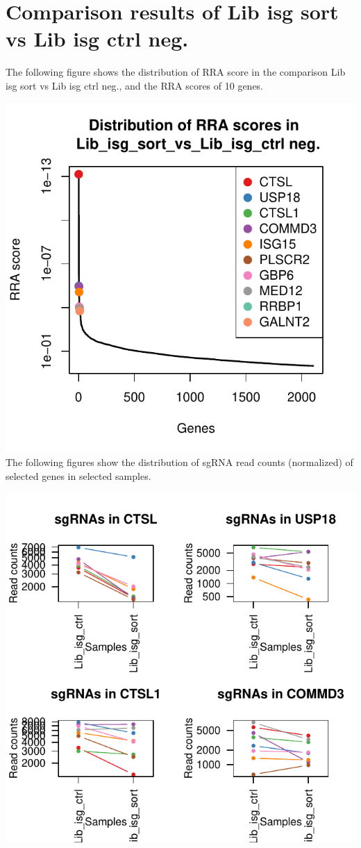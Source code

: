 \documentclass{article}
\begin{document}
\newpage\section{Comparison results of Lib isg sort vs Lib isg ctrl neg.}

The following figure shows the distribution of RRA score in the comparison Lib isg sort vs Lib isg ctrl neg., and the RRA scores of 10 genes.

%


\includegraphics{MageckLibISG_CoVclust_summary-004}
\clearpage
\newpage
The following figures show the distribution of sgRNA read counts (normalized) of selected genes in selected samples.
%


\includegraphics{MageckLibISG_CoVclust_summary-005}
%
\end{document}
